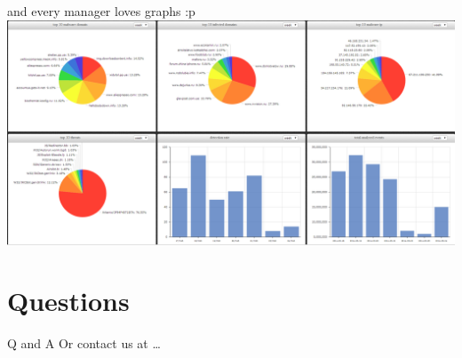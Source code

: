 \documentclass[presentation,smaller]{beamer}
\begin{document}
\begin{frame}[label=sec-7-11]{and every manager loves graphs :p}
\includegraphics[width=14cm]{images/ioc02.png}
\end{frame}

\section{Questions}
\label{sec-8}
\begin{frame}[label=sec-8-1]{Q and A}
Or contact us at \ldots{}
\end{frame}
\end{document}
